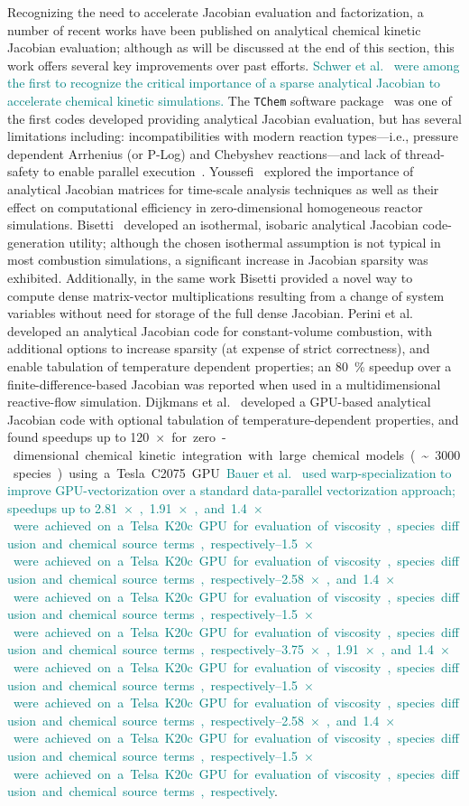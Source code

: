 \documentclass[12pt,number,sort&compress,preprint]{elsarticle}
\newcommand{\add}[1]{{\sloppy\textcolor{teal}{#1}}}  %
\begin{document}
Recognizing the need to accelerate Jacobian evaluation and factorization, a number of recent works have been published on analytical chemical kinetic Jacobian evaluation; although as will be discussed at the end of this section, this work offers several key improvements over past efforts.
\add{Schwer et al.~\cite{SCHWER2002270} were among the first to recognize the critical importance of a sparse analytical Jacobian to accelerate chemical kinetic simulations.}
The \texttt{TChem} software package~\cite{Safta:2011vn} was one of the first codes developed providing analytical Jacobian evaluation, but has several limitations including: incompatibilities with modern reaction types---i.e., pressure dependent Arrhenius (or P-Log) and Chebyshev reactions---and lack of thread-safety to enable parallel execution~\cite{Curtis2017:tchem}. 
Youssefi~\cite{Youssefi:2011tm} explored the importance of analytical Jacobian matrices for time-scale analysis techniques as well as their effect on computational efficiency in zero-dimensional homogeneous reactor simulations.
Bisetti~\cite{Bisetti:2012jw} developed an isothermal, isobaric analytical Jacobian code-generation utility; although the chosen isothermal assumption is not typical in most combustion simulations, a significant increase in Jacobian sparsity was exhibited.
Additionally, in the same work Bisetti provided a novel way to compute dense matrix-vector multiplications resulting from a change of system variables without need for storage of the full dense Jacobian.
Perini et al.~\cite{Perini:2012gy} developed an analytical Jacobian code for constant-volume combustion, with additional options to increase sparsity (at expense of strict correctness), and enable tabulation of temperature dependent properties; an \SI{80}{\percent} speedup over a finite-difference-based Jacobian was reported when used in a multidimensional reactive-flow simulation.
Dijkmans et al.~\cite{Dijkmans:2014bb} developed a GPU-based analytical Jacobian code with optional tabulation of temperature-dependent properties, and found speedups up to \SI{120}{$\times$} for zero-dimensional chemical kinetic integration with large chemical models (\textasciitilde\num{3000} species) using a Tesla C2075 GPU.
\add{Bauer et al.~\cite{Bauer:2014} used warp-specialization to improve GPU-vectorization over a standard data-parallel vectorization approach; speedups up to \SIrange{2.81}{3.75}{$\times$}, \SIrange{1.91}{2.58}{$\times$}, and \SIrange{1.4}{1.5}{$\times$} were achieved on a Telsa K20c GPU for evaluation of viscosity, species diffusion and chemical source terms, respectively}.
\end{document}
